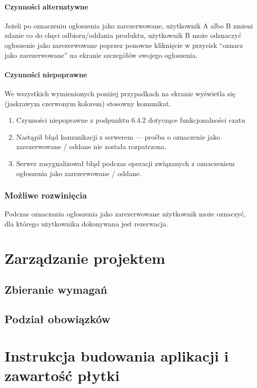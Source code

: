 \documentclass[licencjacka]{pracamgr}
\begin{document}
    \subsubsection{Czynności alternatywne}
    Jeżeli po oznaczeniu ogłoszenia jako zarezerwowane, użytkownik A albo B zmieni zdanie co do chęci odbioru/oddania produktu, użytkownik B może odznaczyć ogłoszenie jako zarezerwowane poprzez ponowne kliknięcie w przycisk ``oznacz jako zarezerwowane'' na ekranie szczegółów swojego ogłoszenia.
    \subsubsection{Czynności niepoprawne}
    We wszystkich wymienionych poniżej przypadkach na ekranie wyświetla się (jaskrawym czerwonym kolorem) stosowny komunikat.
    \begin{enumerate}
        \item Czynności niepoprawne z podpunktu 6.4.2 dotyczące funkcjonalności czatu
        \item Nastąpił błąd komunikacji z serwerem --- prośba o oznaczenie jako zarezerwowane / oddane nie została rozpatrzona.
        \item Serwer zasygnalizował błąd podczas operacji związanych z oznaczeniem ogłoszenia jako zarezerwowane / oddane.
    \end{enumerate}
    \subsection{Możliwe rozwinięcia}
    Podczas oznaczania ogłoszenia jako zarezerwowane użytkownik może oznaczyć, dla którego użytkownika dokonywana jest rezerwacja.

\chapter{Zarządzanie projektem}

\section{Zbieranie wymagań}
\section{Podział obowiązków}

\chapter{Instrukcja budowania aplikacji i zawartość płytki}\label{r:build}
\end{document}
